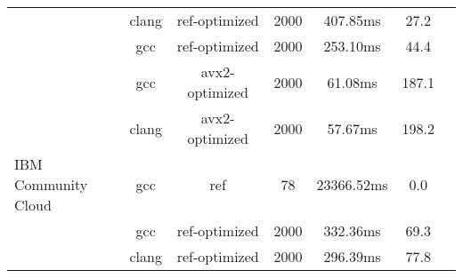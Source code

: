 \begin{table}
\begin{tabularx}{\linewidth}{X c c c c c c}
            &                clang &        ref-optimized &                 2000 &             407.85ms &                 27.2\\
            &                  gcc &        ref-optimized &                 2000 &             253.10ms &                 44.4\\
            &                  gcc &       avx2-optimized &                 2000 &              61.08ms &                187.1\\
            &                clang &       avx2-optimized &                 2000 &              57.67ms &                198.2\\
            \midrule
          \multirowcell{3}{IBM\\ Community Cloud} &                  gcc &                  ref &                   78 &           23366.52ms &                  0.0\\
          &                  gcc &        ref-optimized &                 2000 &             332.36ms &                 69.3\\
          &                clang &        ref-optimized &                 2000 &             296.39ms &                 77.8 \\
        \bottomrule
    \end{tabularx}
\end{table}